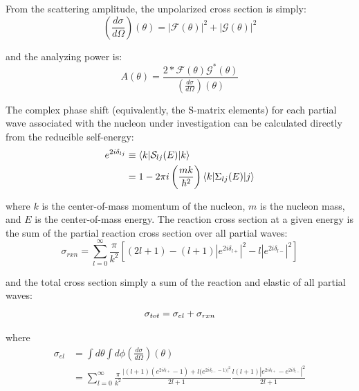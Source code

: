 \noindent
From the scattering amplitude, the unpolarized cross section is simply:
\begin{equation}
    \left(\frac{d\sigma}{d\Omega}\right)(\theta) = |\mathcal{F}(\theta)|^{2}
    +|\mathcal{G}(\theta)|^{2}
\end{equation}

\noindent
and the analyzing power is:
\begin{equation}
    A(\theta) = \frac{2*\mathcal{F}(\theta)\mathcal{G}^{*}(\theta)}
    {\left(\frac{d\sigma}{d\Omega}\right)(\theta)}
\end{equation}

\noindent
The complex phase shift (equivalently, the S-matrix elements) for each partial wave associated
with the nucleon under investigation can be
calculated directly from the reducible self-energy:
\begin{equation}
    \begin{split}
        e^{2i\delta_{lj}} & \equiv \braket{k|\mathcal{S}_{lj}(E)|k}\\
        & = 1 - 2\pi i \left(\frac{mk}{\hbar^{2}}\right) \braket{k|\Sigma_{lj}(E)|j}
    \end{split}
\end{equation}

\noindent
where $k$ is the center-of-mass momentum of the nucleon, $m$ is the nucleon mass, and $E$ is the
center-of-mass energy. The reaction cross section at a given energy is the sum of the partial
reaction cross section over all partial waves:
\begin{equation}
    \sigma_{rxn} = \sum^{\infty}_{l=0}\frac{\pi}{k^{2}}
    \left[(2l+1)-(l+1)|e^{2i\delta_{l+}}|^{2}-l|e^{2i\delta_{l-}}|^{2}\right]
\end{equation}

\noindent
and the total cross section simply a sum of the reaction and elastic of all partial waves:
\begin{equation}
    \sigma_{tot} = \sigma_{el} + \sigma_{rxn}\\
\end{equation}

\noindent
where
\begin{equation}
    \begin{split}
        \sigma_{el} & = \int d\theta \int d\phi \left(\frac{d\sigma}{d\Omega}\right)(\theta)\\
        & = \sum^{\infty}_{l=0}\frac{\pi}{k^{2}}
        \frac{|(l+1)(e^{2i\delta_{l+}}-1)+l(e^{2i\delta_{l-}-1)|^{2}}}{2l+1}
        \frac{l(l+1)|e^{2i\delta_{l+}}-e^{2i\delta_{l-}}|^{2}}{2l+1}
    \end{split}
\end{equation}

